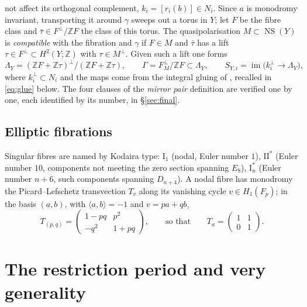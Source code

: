 \documentclass[11pt]{article}
\newcommand{\Z}{\mathbb Z}
\newcommand{\NS}{\operatorname{NS}}
\newcommand{\im}{\operatorname{im}}
\newcommand{\II}{\mathrm{II}}
\newcommand{\I}{\mathrm{I}}
\theoremstyle{definition}
\theoremstyle{remark}
\begin{document}
not affect its orthogonal complement, \(k_i=[r_i(b)]\in N_i\). Since
\(a\) is monodromy invariant, transporting it around \(\gamma\) sweeps
out a torus in \(Y\); let \(F\) be the fibre class and
\(\bar\tau\in F^\perp/\Z F\) the class of this torus. The
quasipolarisation \(M\subset\NS(Y)\) is \emph{compatible} with the
fibration and \(\gamma\) \cite[Definition~4.21]{GT} if \(F\in M\) and
\(\bar\tau\) has a lift \(\tau\in F^\perp\subset H^2(Y;\Z)\) with
\(\tau\in M^\perp\). Given such a lift one forms
\begin{equation}\label{eq:LambdaY}
 \Lambda_Y=(\Z F+\Z\tau)^\perp/(\Z F+\Z\tau),\qquad
 \Gamma=F^\perp_M/\Z F\subset\Lambda_Y,\qquad
 S_{Y,i}=\im\bigl(k_i^\perp\longrightarrow\Lambda_Y\bigr),
\end{equation}
where \(k_i^\perp\subset N_i\) and the maps come from the integral
gluing of \cite[Propositions~4.18 and~4.20]{GT}, recalled in
\eqref{eq:glue} below. The four clauses of the \emph{mirror pair} definition
\cite[Definition~5.1]{GT} are verified one by one, each identified by
its number, in \S\ref{sec:final}.

\subsection{Elliptic fibrations}

Singular fibres are named by Kodaira type: \(\I_1\) (nodal, Euler
number \(1\)), \(\II^*\) (Euler number \(10\), components not meeting
the zero section spanning \(E_8\)), \(\I_n^*\) (Euler number \(n+6\),
such components spanning \(D_{n+4}\)). A nodal fibre has monodromy the Picard--Lefschetz
transvection \(T_v\) along its vanishing cycle \(v\in H_1(F_p)\); in
the basis \((a,b)\), with \(\langle a,b\rangle=-1\) and \(v=pa+qb\),
\begin{equation}\label{eq:PL}
 T_{(p,q)}=\left(\begin{smallmatrix}1-pq&p^2\\-q^2&1+pq\end{smallmatrix}\right),
 \qquad\text{so that}\qquad
 T_a=\left(\begin{smallmatrix}1&1\\0&1\end{smallmatrix}\right).
\end{equation}

\section{The restriction period and very generality}\label{sec:period}
\end{document}
